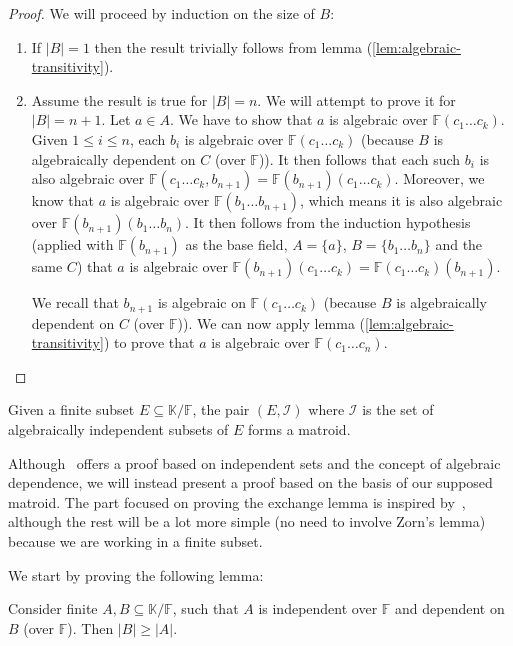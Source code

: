\begin{proof}
  We will proceed by induction on the size of $B$:
  \begin{enumerate}
    \item If $|B| = 1$ then the result trivially follows from lemma (\ref{lem:algebraic-transitivity}).
    \item Assume the result is true for $|B| = n$. We will attempt to prove it for $|B| = n + 1$. Let $a \in A$. We have to show that $a$ is algebraic over $\mathbb{F}(c _1 \ldots c _k )$. Given $1 \leq i \leq n$, each $b _i$ is algebraic over $\mathbb{F}(c _1 \ldots c _k )$ (because $B$ is algebraically dependent on $C$ (over $\mathbb{F}$)). It then follows that each such $b _i $ is also algebraic over $\mathbb{F}(c _1 \ldots c _k, b _{n + 1}) = \mathbb{F} (b _{n + 1} )(c _1 \ldots c _k )$. Moreover, we know that $a$ is algebraic over $\mathbb{F} (b _1 \ldots b _{n + 1})$, which means it is also algebraic over $\mathbb{F} (b _{n + 1})(b _1 \ldots b _n )$. It then follows from the induction hypothesis (applied with $\mathbb{F} (b _{n + 1})$ as the base field, $A = \{a\}$, $B = \{b _1 \ldots b _n \}$ and the same $C$) that $a$ is algebraic over $\mathbb{F} (b _{n + 1})(c _1 \ldots c _k ) = \mathbb{F} (c _1 \ldots c _k )(b _{n + 1})$. 

      We recall that $b _{n + 1}$ is algebraic on $\mathbb{F} (c _1 \ldots c _k )$ (because $B$ is algebraically dependent on $C$ (over $\mathbb{F} $)). We can now apply lemma (\ref{lem:algebraic-transitivity}) to prove that $a$ is algebraic over $\mathbb{F} (c _1 \ldots c _n)$.
  \end{enumerate}
\end{proof}

\begin{theorem}\label{thm:algebraic-matroids-are-matroids}
    Given a finite subset $E \subseteq \mathbb K / \mathbb F$, the pair $(E, \mathcal I)$  where $\mathcal I$ is the set of algebraically independent subsets of $E$ forms a matroid.
\end{theorem}

    Although~\cite{oxley1} offers a proof based on independent sets and the concept of algebraic dependence, we will instead present a proof based on the basis of our supposed matroid. The part focused on proving the exchange lemma is inspired by~\cite{milne2022}, although the rest will be a lot more simple (no need to involve Zorn's lemma) because we are working in a finite subset.


  We start by proving the following lemma:
  \begin{lemma}\label{lem:algebraic-indep-smaller-than-dep}
    Consider finite $A, B \subseteq \mathbb K / \mathbb F$, such that $A$ is independent over $\mathbb F$ and dependent on $B$ (over $\mathbb F$). Then $|B| \geq |A|$.
  \end{lemma}

